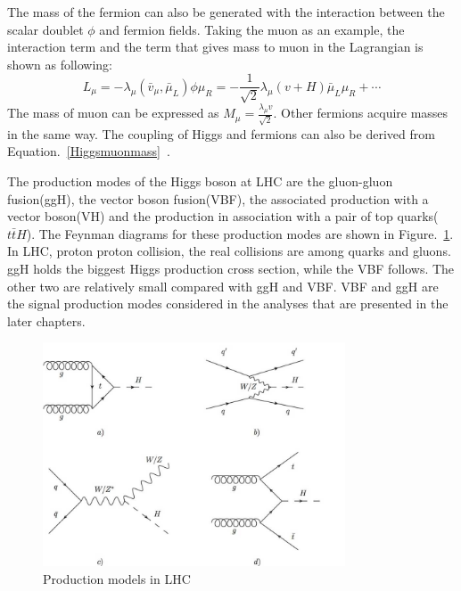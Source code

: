 The mass of the fermion can also be generated with the interaction between the scalar doublet $\phi$ and fermion fields. Taking the muon as an example, the interaction term and the term that gives mass to muon in the Lagrangian is shown as following:
\begin{equation}\label{Higgsmuonmass}
L_{\mu}=-\lambda_{\mu}(\bar{v}_{\mu},\bar{\mu}_{L})\phi\mu_{R}
            =-\frac{1}{\sqrt{2}}\lambda_{\mu}(v+H)\bar{\mu}_{L}\mu_{R}+ \cdots
\end{equation}
The mass of muon can be expressed as $M_{\mu}=\frac{\lambda_{\mu}v}{\sqrt{2}}$. Other fermions acquire masses in the same way. The coupling of Higgs and fermions can also be derived from Equation.~\ref{Higgsmuonmass}~\cite{DJOUADI20081}. 

The production modes of the Higgs boson at LHC are the gluon-gluon fusion(ggH), the vector boson fusion(VBF), the associated production with a vector boson(VH) and the production in association with a pair of top quarks($t\bar{t}H$). The Feynman diagrams for these production modes are shown in Figure.~\ref{fig:SM_H_production}. In LHC, proton proton collision, the real collisions are among quarks and gluons. ggH holds the biggest Higgs production cross section, while the VBF follows. The other two are relatively small compared with ggH and VBF. VBF and ggH are the signal production modes considered in the analyses that are presented in the later chapters. 

\begin{figure}[htbp] 
\centering
\includegraphics[width=0.8\textwidth]{chapter2/Higgs_production.jpg}
\caption{Production models in LHC}%
\label{fig:SM_H_production}
\end{figure}

